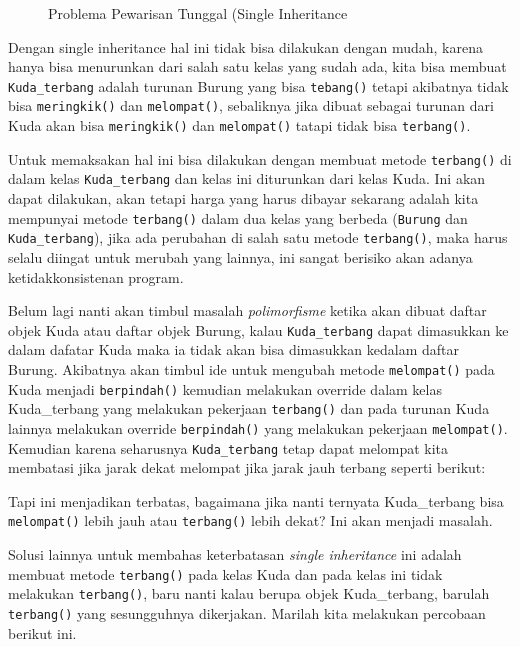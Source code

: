 \begin{figure}[htbp]
\centering
{}
\caption{Problema Pewarisan Tunggal (Single Inheritance}
\end{figure}

Dengan single inheritance hal ini tidak bisa dilakukan dengan mudah,
karena hanya bisa menurunkan dari salah satu kelas yang sudah ada, kita
bisa membuat \texttt{Kuda\_terbang} adalah turunan Burung yang bisa
\texttt{tebang()} tetapi akibatnya tidak bisa \texttt{meringkik()} dan
\texttt{melompat()}, sebaliknya jika dibuat sebagai turunan dari Kuda
akan bisa \texttt{meringkik()} dan \texttt{melompat()} tatapi tidak bisa
\texttt{terbang()}.

Untuk memaksakan hal ini bisa dilakukan dengan membuat metode
\texttt{terbang()} di dalam kelas \texttt{Kuda\_terbang} dan kelas ini
diturunkan dari kelas Kuda. Ini akan dapat dilakukan, akan tetapi harga
yang harus dibayar sekarang adalah kita mempunyai metode
\texttt{terbang()} dalam dua kelas yang berbeda (\texttt{Burung} dan
\texttt{Kuda\_terbang}), jika ada perubahan di salah satu metode
\texttt{terbang()}, maka harus selalu diingat untuk merubah yang
lainnya, ini sangat berisiko akan adanya ketidakkonsistenan program.

Belum lagi nanti akan timbul masalah \emph{polimorfisme} ketika akan
dibuat daftar objek Kuda atau daftar objek Burung, kalau
\texttt{Kuda\_terbang} dapat dimasukkan ke dalam dafatar Kuda maka ia
tidak akan bisa dimasukkan kedalam daftar Burung. Akibatnya akan timbul
ide untuk mengubah metode \texttt{melompat()} pada Kuda menjadi
\texttt{berpindah()} kemudian melakukan override dalam kelas
Kuda\_terbang yang melakukan pekerjaan \texttt{terbang()} dan pada
turunan Kuda lainnya melakukan override \texttt{berpindah()} yang
melakukan pekerjaan \texttt{melompat()}. Kemudian karena seharusnya
\texttt{Kuda\_terbang} tetap dapat melompat kita membatasi jika jarak
dekat melompat jika jarak jauh terbang seperti berikut:



Tapi ini menjadikan terbatas, bagaimana jika nanti ternyata
Kuda\_terbang bisa \texttt{melompat()} lebih jauh atau
\texttt{terbang()} lebih dekat? Ini akan menjadi masalah.

Solusi lainnya untuk membahas keterbatasan \emph{single inheritance} ini
adalah membuat metode \texttt{terbang()} pada kelas Kuda dan pada kelas
ini tidak melakukan \texttt{terbang()}, baru nanti kalau berupa objek
Kuda\_terbang, barulah \texttt{terbang()} yang sesungguhnya dikerjakan.
Marilah kita melakukan percobaan berikut ini.

